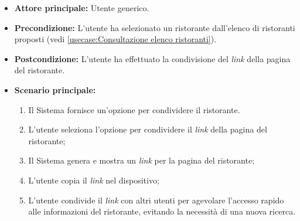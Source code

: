 \label{usecase:Condivisione link del ristorante}
\begin{itemize}
    \item \textbf{Attore principale:} Utente generico.


	\item \textbf{Precondizione:} 
		  L'utente ha selezionato un ristorante dall'elenco di ristoranti proposti (vedi \autoref{usecase:Consultazione elenco ristoranti}).

	\item \textbf{Postcondizione:}
	      L'utente ha effettuato la condivisione del \textit{link} della pagina del ristorante.

	\item \textbf{Scenario principale:}
	      \begin{enumerate}
			  \item Il Sistema fornisce un'opzione per condividere il ristorante.
			  \item L'utente seleziona l'opzione per condividere il \textit{link} della pagina del ristorante;
		      \item Il Sistema genera e mostra un \textit{link} per la pagina del ristorante;
		      \item L'utente copia il \textit{link} nel dispositivo;
			  \item L'utente condivide il \textit{link} con altri utenti per agevolare l'accesso rapido alle 
			  		informazioni del ristorante, evitando la necessità di una nuova ricerca.
	      \end{enumerate}
\end{itemize}
